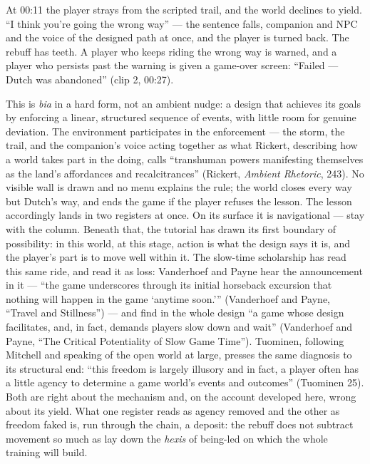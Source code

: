 \documentclass{article}
\begin{document}
At 00:11 the player strays from the scripted trail, and the world declines to yield. ``I think you're going the wrong way'' — the sentence falls, companion and NPC and the voice of the designed path at once, and the player is turned back. The rebuff has teeth. A player who keeps riding the wrong way is warned, and a player who persists past the warning is given a game-over screen: ``Failed --- Dutch was abandoned'' (clip 2, 00:27).


This is \textit{bia} in a hard form, not an ambient nudge: a design that achieves its goals by enforcing a linear, structured sequence of events, with little room for genuine deviation. The environment participates in the enforcement — the storm, the trail, and the companion's voice acting together as what Rickert, describing how a world takes part in the doing, calls ``transhuman powers manifesting themselves as the land's affordances and recalcitrances'' (Rickert, \textit{Ambient Rhetoric}, 243). No visible wall is drawn and no menu explains the rule; the world closes every way but Dutch's way, and ends the game if the player refuses the lesson. The lesson accordingly lands in two registers at once. On its surface it is navigational — stay with the column. Beneath that, the tutorial has drawn its first boundary of possibility: in this world, at this stage, action is what the design says it is, and the player's part is to move well within it.
The slow-time scholarship has read this same ride, and read it as loss: Vanderhoef and Payne hear the announcement in it — ``the game underscores through its initial horseback excursion that nothing will happen in the game `anytime soon.'{}'' (Vanderhoef and Payne, ``Travel and Stillness'') — and find in the whole design ``a game whose design facilitates, and, in fact, demands players slow down and wait'' (Vanderhoef and Payne, ``The Critical Potentiality of Slow Game Time''). Tuominen, following Mitchell and speaking of the open world at large, presses the same diagnosis to its structural end: ``this freedom is largely illusory and in fact, a player often has a little agency to determine a game world's events and outcomes'' (Tuominen 25). Both are right about the mechanism and, on the account developed here, wrong about its yield. What one register reads as agency removed and the other as freedom faked is, run through the chain, a deposit: the rebuff does not subtract movement so much as lay down the \textit{hexis} of being-led on which the whole training will build.
\end{document}
